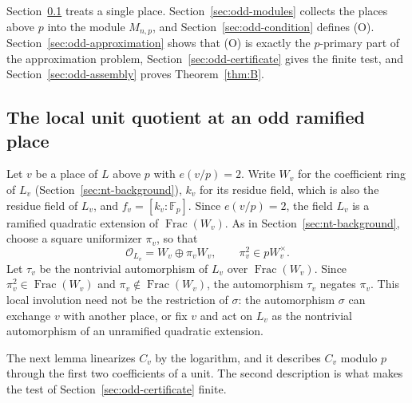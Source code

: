 \documentclass[11pt]{article}
\theoremstyle{plain}
\theoremstyle{definition}
\theoremstyle{remark}
\DeclareMathOperator{\Frac}{Frac}
\newcommand{\F}{\mathbb F}
\newcommand{\OO}{\mathcal O}
\begin{document}
Section~\ref{sec:odd-local} treats a single place.
Section~\ref{sec:odd-modules} collects the places above $p$ into the
module $M_{n,p}$, and Section~\ref{sec:odd-condition} defines (O).
Section~\ref{sec:odd-approximation} shows that (O) is exactly the
$p$-primary part of the approximation problem,
Section~\ref{sec:odd-certificate} gives the finite test, and
Section~\ref{sec:odd-assembly} proves Theorem~\ref{thm:B}.

\subsection{The local unit quotient at an odd ramified place}\label{sec:odd-local}
Let $v$ be a place of $L$ above $p$ with $e(v/p)=2$.  Write $W_v$
for the coefficient ring of $L_v$ (Section~\ref{sec:nt-background}),
$k_v$ for its residue field, which is also the residue field of $L_v$,
and $f_v=[k_v:\F_p]$.  Since $e(v/p)=2$, the field $L_v$ is a ramified
quadratic extension of $\Frac(W_v)$.  As in
Section~\ref{sec:nt-background}, choose a square uniformizer $\pi_v$, so
that
\[
 \OO_{L_v}=W_v\oplus\pi_vW_v,\qquad
 \pi_v^2\in pW_v^\times.
\]
Let $\tau_v$ be the nontrivial automorphism of $L_v$ over $\Frac(W_v)$.
Since $\pi_v^2\in\Frac(W_v)$ and $\pi_v\notin\Frac(W_v)$, the
automorphism $\tau_v$ negates $\pi_v$.  This local involution need not be
the restriction of $\sigma$: the automorphism $\sigma$ can exchange $v$
with another place, or fix $v$ and act on $L_v$ as the nontrivial
automorphism of an unramified quadratic extension.

The next lemma linearizes $C_v$ by the logarithm, and it describes $C_v$
modulo $p$ through the first two coefficients of a unit.  The second
description is what makes the test of Section~\ref{sec:odd-certificate}
finite.
\end{document}
